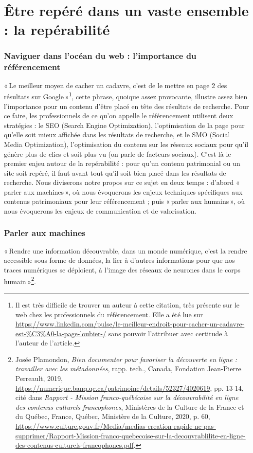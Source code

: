 \chapter{Être repéré dans un vaste ensemble : la repérabilité}

\subsection{Naviguer dans l'océan du web : l'importance du référencement}

« Le meilleur moyen de cacher un cadavre, c’est de le mettre en page 2 des résultats sur Google »\footnote{Il est très difficile de trouver un auteur à cette citation, très présente sur le web chez les professionnels du référencement. Elle a été lue sur \url{https://www.linkedin.com/pulse/le-meilleur-endroit-pour-cacher-un-cadavre-est-\%C3\%A0-la-page-loubier-/} sans pouvoir l’attribuer avec certitude à l’auteur de l’article.}, cette phrase, quoique assez provocante, illustre assez bien l’importance pour un contenu d’être placé en tête des résultats de recherche. Pour ce faire, les professionnels de ce qu’on appelle le référencement utilisent deux stratégies : le SEO (Search Engine Optimization), l'optimisation de la page pour qu’elle soit mieux affichée dans les résultats de recherche, et le SMO (Social Media Optimization), l'optimisation du contenu sur les réseaux sociaux pour qu’il génère plus de clics et soit plus vu (on parle de facteurs sociaux). C’est là le premier enjeu autour de la repérabilité : pour qu’un contenu patrimonial ou un site soit repéré, il faut avant tout qu’il soit bien placé dans les résultats de recherche. Nous diviserons notre propos sur ce sujet en deux temps : d’abord « parler aux machines », où nous évoquerons les enjeux techniques spécifiques aux contenus patrimoniaux pour leur référencement ; puis « parler aux humains », où nous évoquerons les enjeux de communication et de valorisation. 

\subsection*{Parler aux machines}
« Rendre une information découvrable, dans un monde numérique, c’est la rendre accessible sous forme de données, la lier à d’autres informations pour que nos traces numériques se déploient, à l’image des réseaux de neurones dans le corps humain »\footnote{Josée Plamondon, \textit{Bien documenter pour favoriser la découverte en ligne : travailler avec les métadonnées}, rapp. tech., Canada, Fondation Jean-Pierre Perreault, 2019, \url{https://numerique.banq.qc.ca/patrimoine/details/52327/4020619}, pp. 13-14, cité dans \textit{Rapport - Mission franco-québécoise sur la découvrabilité en ligne des contenus culturels francophones}, Ministères de la Culture de la France et du Québec, France, Québec, Ministère de la Culture, 2020, p. 60, \url{https://www.culture.gouv.fr/Media/medias-creation-rapide-ne-pas-supprimer/Rapport-Mission-franco-quebecoise-sur-la-decouvrablilite-en-ligne-des-contenus-culturels-francophones.pdf}.}.

